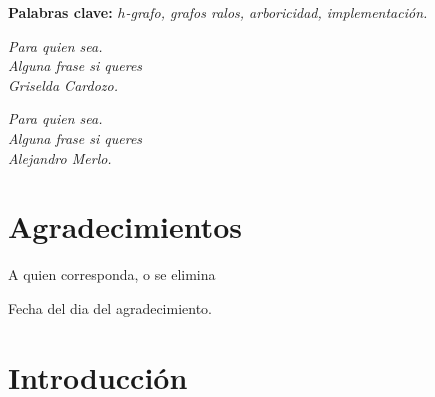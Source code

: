 \documentclass[%
    a4paper,%
    fontsize=12pt,%
    DIV=12,
    twoside,%
    openright,%
    titlepage=true,%
    headsepline,%
    toc=bibliography,%
    parskip=half,%
    cleardoublepage=empty,%
    headings=big,%
]{scrbook}
\begin{document}
\noindent \textbf{Palabras clave:} \textit{$h$-grafo, grafos ralos, arboricidad, implementación.}

\newpage
\cleardoublepage




{\raggedleft\emph{Para quien sea.\\ Alguna frase si queres\\Griselda Cardozo.}\par
            \emph{Para quien sea.\\ Alguna frase si queres\\Alejandro Merlo.}\par}

\cleardoublepage

\chapter*{Agradecimientos}

A quien corresponda, o se elimina

 Fecha del dia del agradecimiento.

\cleardoublepage

\tableofcontents

\mainmatter

\chapter{Introducción}
\label{sec:introduccion}
\end{document}
